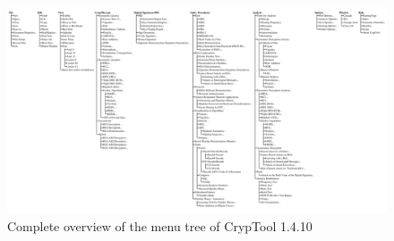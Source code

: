 \clearpage
\begin{figure}[hb]
\begin{center}
\vspace{-30pt}
\includegraphics[scale=0.25, angle=270, viewport=200 30 2660 1430]
                {figures/cryptool-menu-en}
\caption{Complete overview of the menu tree of CrypTool 1.4.10} 
\label{menuoverview}
\end{center}
\end{figure}
\clearpage

